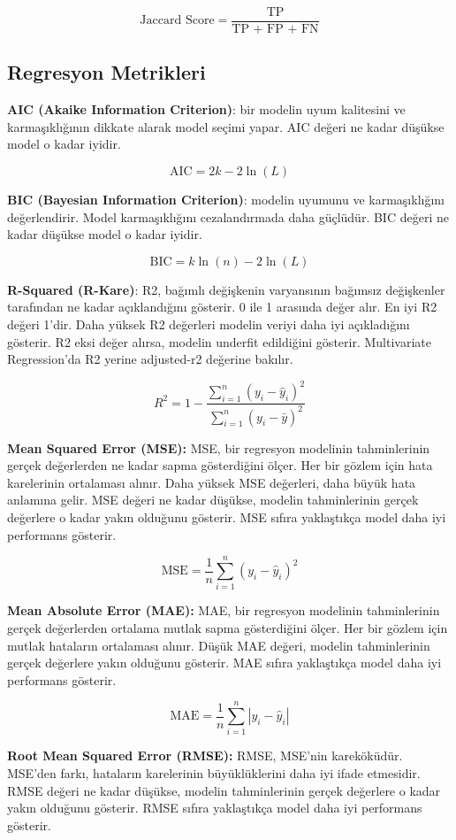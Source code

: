 \[\text{Jaccard Score} = \frac{\text{TP}}{\text{TP + FP + FN}}\]

\subsection{Regresyon Metrikleri}

\textbf{AIC (Akaike Information Criterion)}: bir modelin uyum kalitesini ve karmaşıklığının dikkate alarak model seçimi yapar. AIC değeri ne kadar düşükse model o kadar iyidir.

\[ \text{AIC} = 2k - 2\ln(L) \]

\textbf{BIC (Bayesian Information Criterion)}: modelin uyumunu ve karmaşıklığını değerlendirir. Model karmaşıklığını cezalandırmada daha güçlüdür. BIC değeri ne kadar düşükse model o kadar iyidir.

\[ \text{BIC} = k \ln(n) - 2\ln(L) \]

\textbf{R-Squared (R-Kare)}: R2, bağımlı değişkenin varyansının bağımsız değişkenler tarafından ne kadar açıklandığını gösterir. 0 ile 1 arasında değer alır. En iyi R2 değeri 1'dir. Daha yüksek R2 değerleri modelin veriyi daha iyi açıkladığını gösterir. R2 eksi değer alırsa, modelin underfit edildiğini gösterir. Multivariate Regression'da R2 yerine adjusted-r2 değerine bakılır.

\[R^2 = 1 - \frac{\sum_{i=1}^{n} (y_i - \hat{y}_i)^2}{\sum_{i=1}^{n} (y_i - \bar{y})^2}\]

\textbf{Mean Squared Error (MSE):} MSE, bir regresyon modelinin tahminlerinin gerçek değerlerden ne kadar sapma gösterdiğini ölçer. Her bir gözlem için hata karelerinin ortalaması alınır. Daha yüksek MSE değerleri, daha büyük hata anlamına gelir. MSE değeri ne kadar düşükse, modelin tahminlerinin gerçek değerlere o kadar yakın olduğunu gösterir. MSE sıfıra yaklaştıkça model daha iyi performans gösterir.

\[\text{MSE} = \frac{1}{n} \sum_{i=1}^{n} (y_i - \hat{y}_i)^2\]

\textbf{Mean Absolute Error (MAE):} MAE, bir regresyon modelinin tahminlerinin gerçek değerlerden ortalama mutlak sapma gösterdiğini ölçer. Her bir gözlem için mutlak hataların ortalaması alınır. Düşük MAE değeri, modelin tahminlerinin gerçek değerlere yakın olduğunu gösterir. MAE sıfıra yaklaştıkça model daha iyi performans gösterir.

\[\text{MAE} = \frac{1}{n} \sum_{i=1}^{n} |y_i - \hat{y}_i|\]

\textbf{Root Mean Squared Error (RMSE):} RMSE, MSE'nin kareköküdür. MSE'den farkı, hataların karelerinin büyüklüklerini daha iyi ifade etmesidir. RMSE değeri ne kadar düşükse, modelin tahminlerinin gerçek değerlere o kadar yakın olduğunu gösterir. RMSE sıfıra yaklaştıkça model daha iyi performans gösterir.


